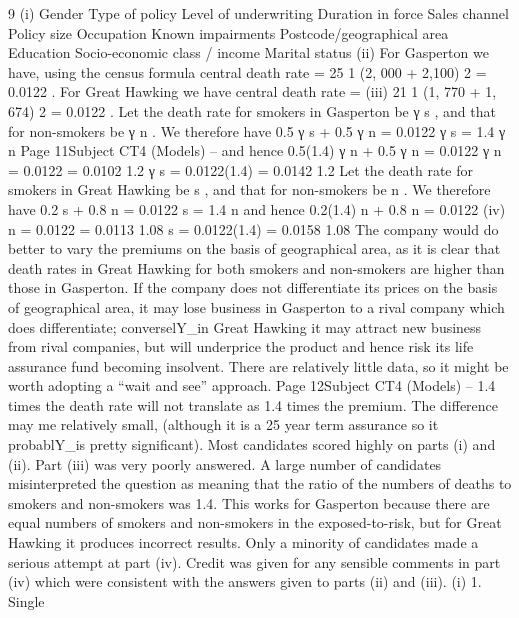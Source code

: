 \documentclass[a4paper,12pt]{article}
\begin{document}
\begin{enumerate}

9
(i)
Gender
Type of policy
Level of underwriting
Duration in force
Sales channel
Policy size
Occupation
Known impairments
Postcode/geographical area
Education
Socio-economic class / income
Marital status
(ii)
For Gasperton we have, using the census formula central death rate
=
25
1
(2, 000 + 2,100)
2
= 0.0122 .
For Great Hawking we have central death rate
=
(iii)
21
1
(1, 770 + 1, 674)
2
= 0.0122 .
Let the death rate for smokers in Gasperton be γ s , and that for non-smokers be γ n .
We therefore have
0.5 γ s + 0.5 γ n = 0.0122
γ s = 1.4 γ n
Page 11Subject CT4 (Models) – %
and hence
0.5(1.4) γ n + 0.5 γ n = 0.0122
γ n = 0.0122
= 0.0102
1.2
γ s = 0.0122(1.4)
= 0.0142
1.2
Let the death rate for smokers in Great Hawking be \upsilon s , and that for
non-smokers be \upsilon n .
We therefore have
0.2 \upsilon s + 0.8 \upsilon n = 0.0122
\upsilon s = 1.4 \upsilon n
and hence
0.2(1.4) \upsilon n + 0.8 \upsilon n = 0.0122
(iv)
\upsilon n = 0.0122
= 0.0113
1.08
\upsilon s = 0.0122(1.4)
= 0.0158
1.08
The company would do better to vary the premiums on the basis of geographical area,
as it is clear that death rates in Great Hawking for both smokers and non-smokers are higher than those in Gasperton.
If the company does not differentiate its prices on the basis of geographical area, it may lose business in Gasperton to a rival company which does differentiate;
converselY_in Great Hawking it may attract new business from rival companies, but will underprice the product and hence risk its life assurance fund becoming insolvent.
There are relatively little data, so it might be worth adopting a “wait and see”
approach.
Page 12Subject CT4 (Models) – %
1.4 times the death rate will not translate as 1.4 times the premium. The difference
may me relatively small, (although it is a 25 year term assurance so it probablY_is
pretty significant).
Most candidates scored highly on parts (i) and (ii). Part (iii) was very poorly answered. A large number of candidates misinterpreted the question as meaning that the ratio of the
numbers of deaths to smokers and non-smokers was 1.4. This works for Gasperton because there are equal numbers of smokers and non-smokers in the exposed-to-risk, but for Great
Hawking it produces incorrect results. Only a minority of candidates made a serious attempt
at part (iv). Credit was given for any sensible comments in part (iv) which were consistent
with the answers given to parts (ii) and (iii).
(i)
1. Single

\end{enumerate}
\end{document}
